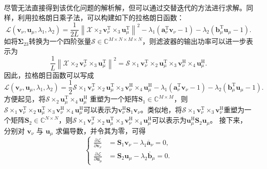 尽管无法直接得到该优化问题的解析解，但可以通过交替迭代的方法进行求解。同样，利用拉格朗日乘子法，可以构建如下的拉格朗日函数：
\[
    \mathcal{L}(\bm{v}_{\nu}, \bm{u}_{\mu}, \lambda_1, \lambda_2)
    = \frac{1}{2L} \left\| \mathcal{X} \times_2 \bm{v}_{\nu}^{\mathrm{T}} \times_3 \bm{u}_{\mu}^{\mathrm{T}} \right\|^2
      - \lambda_1 \left( \bm{a}^{\mathrm{T}}_{\nu} \bm{v}_{\nu} - 1 \right)
      - \lambda_2 \left( \bm{b}^{\mathrm{T}}_{\mu} \bm{u}_{\mu} - 1 \right).
\]
如将\( \mathbf{\Sigma}_{23} \)转换为一个四阶张量\( \mathcal{S} \in \mathbb{C}^{M \times N \times M \times N} \)，则滤波器的输出功率可以进一步表示为
\[
    \frac{1}{L} \left\| \mathcal{X} \times_2 \bm{v}_{\nu}^{\mathrm{T}} \times_3 \bm{u}_{\mu}^{\mathrm{T}} \right\|^2 = \mathcal{S} \times_1 \bm{v}_{\nu}^{\mathrm{T}} \times_2 \bm{u}_{\mu}^{\mathrm{T}} \times_3 \bm{v}_{\nu}^{\mathrm{H}} \times_4 \bm{u}_{\mu}^{\mathrm{H}}.
\]
因此，拉格朗日函数可以写成
\[
    \mathcal{L}(\bm{v}_{\nu}, \bm{u}_{\mu}, \lambda_1, \lambda_2)
    = \frac{1}{2}\mathcal{S} \times_1 \bm{v}_{\nu}^{\mathrm{T}} \times_2 \bm{u}_{\mu}^{\mathrm{T}} \times_3 \bm{v}_{\nu}^{\mathrm{H}} \times_4 \bm{u}_{\mu}^{\mathrm{H}}
      - \lambda_1 \left( \bm{a}^{\mathrm{T}}_{\nu} \bm{v}_{\nu} - 1 \right)
      - \lambda_2 \left( \bm{b}^{\mathrm{T}}_{\mu} \bm{u}_{\mu} - 1 \right).
\]
方便起见，将\(\mathcal{S} \times_2 \bm{u}_{\mu}^{\mathrm{T}} \times_4 \bm{u}_{\mu}^{\mathrm{H}}\) 重塑为一个矩阵\( \mathbf{S}_{1} \in \mathbb{C}^{M \times M} \)，则\(  \mathcal{S} \times_1 \bm{v}_{\nu}^{\mathrm{T}} \times_2 \bm{u}_{\mu}^{\mathrm{T}} \times_3 \bm{v}_{\nu}^{\mathrm{H}} \times_4 \bm{u}_{\mu}^{\mathrm{H}} \)可以表示为\(\bm{v}_{\nu}^{\mathrm{H}} \mathbf{S}_1 \bm{v}_{\nu}\)。类似地，将\(\mathcal{S} \times_1 \bm{v}_{\nu}^{\mathrm{T}} \times_3 \bm{v}_{\nu}^{\mathrm{H}}\)重塑为一个矩阵\( \mathbf{S}_{2} \in \mathbb{C}^{N \times N} \)，则\(  \mathcal{S} \times_1 \bm{v}_{\nu}^{\mathrm{T}} \times_2 \bm{u}_{\mu}^{\mathrm{T}} \times_3 \bm{v}_{\nu}^{\mathrm{H}} \times_4 \bm{u}_{\mu}^{\mathrm{H}} \)可以表示为\(\bm{u}_{\mu}^{\mathrm{H}} \mathbf{S}_2 \bm{u}_{\mu}\)。
接下来，分别对 \( \bm{v}_{\nu} \) 与 \( \bm{u}_{\mu} \) 求偏导数，并令其为零，可得
\[
    \begin{cases}
        \frac{\partial \mathcal{L}}{\partial \bm{v}_{\nu}} 
        & = \mathbf{S}_1 \bm{v}_{\nu} - \lambda_1 \overline{\bm{a}}_{\nu} = 0, \\
        \frac{\partial \mathcal{L}}{\partial \bm{u}_{\mu}} 
        & = \mathbf{S}_2 \bm{u}_{\mu} - \lambda_2 \overline{\bm{b}}_{\mu} = 0.
    \end{cases}
\]
